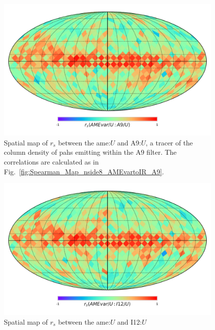      \begin{figure}
       \includegraphics[width=\textwidth/2]{../Plots/Allsky_Corr/UNorm/Spearman_Map_nside8_AMEvartoA9.pdf}
       \centering
       \caption{Spatial map of $r_{s}$ between the \gls{ame}:$U$ and A9:$U$, a tracer of the column density of \gls{pah}s emitting within the A9 filter. The correlations are calculated as in Fig.~\ref{fig:Spearman_Map_nside8_AMEvartoIR_A9}.}
       \label{fig:Spearman_Map_nside8_AMEvartoIR_UNorm_A9}
     \end{figure}
     \begin{figure}
       \includegraphics[width=\textwidth/2]{../Plots/Allsky_Corr/UNorm/Spearman_Map_nside8_AMEvartoI12.pdf}
       \centering
       \caption{Spatial map of $r_{s}$ between the \gls{ame}:$U$ and I12:$U$}
       \label{fig:Spearman_Map_nside8_AMEvartoIR_UNorm_I12}
     \end{figure}
